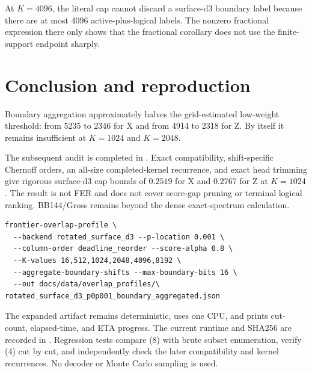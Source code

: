 \documentclass[11pt]{article}
\begin{document}
At \(K=4096\), the literal cap cannot discard a surface-d3 boundary label
because there are at most 4096 active-plus-logical labels.  The nonzero
fractional expression there only shows that the fractional corollary does
not use the finite-support endpoint sharply.

\section{Conclusion and reproduction}

Boundary aggregation approximately halves the grid-estimated low-weight
threshold: from 5235 to 2346 for X and from 4914 to 2318 for Z.  By itself it
remains insufficient at \(K=1024\) and \(K=2048\).

The subsequent audit is completed in
\texttt{}.  Exact compatibility,
shift-specific Chernoff orders, an all-size completed-kernel recurrence, and
exact head trimming give rigorous surface-d3 cap bounds of \(0.2519\) for X
and \(0.2767\) for Z at \(K=1024\).  The result is not FER and does not cover
score-gap pruning or terminal logical ranking.  BB144/Gross remains beyond
the dense exact-spectrum calculation.

\begin{verbatim}
frontier-overlap-profile \
  --backend rotated_surface_d3 --p-location 0.001 \
  --column-order deadline_reorder --score-alpha 0.8 \
  --K-values 16,512,1024,2048,4096,8192 \
  --aggregate-boundary-shifts --max-boundary-bits 16 \
  --out docs/data/overlap_profiles/\
rotated_surface_d3_p0p001_boundary_aggregated.json
\end{verbatim}
The expanded artifact remains deterministic, uses one CPU, and prints
cut-count, elapsed-time, and ETA progress.  The current runtime and SHA256
are recorded in \texttt{\detokenize{WORKLOG.tex}}.  Regression tests compare
(8) with brute subset enumeration, verify (4) cut by cut, and independently
check the later compatibility and kernel recurrences.  No decoder or Monte
Carlo sampling is used.
\end{document}
